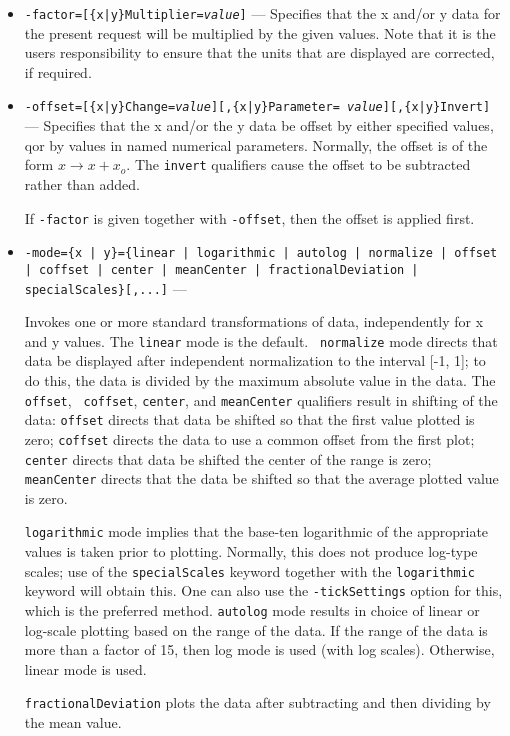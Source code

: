 \begin{itemize}
\begin{itemize}
\begin{itemize}
  \item {\tt -factor=[\{x|y\}Multiplier={\em value}]} --- Specifies that the x
and/or y data for the present request will be multiplied by the given values.  Note that it is the
users responsibility to ensure that the units that are displayed are corrected, if required.

  \item {\tt -offset=[\{x|y\}Change={\em value}][,\{x|y\}Parameter={\em
value}][,\{x|y\}Invert]} --- Specifies that the x and/or the y data be
offset by either specified values, qor by values in named numerical
parameters.  Normally, the offset is of the form $x \rightarrow
x+x_o$.  The {\tt invert} qualifiers cause the offset to be subtracted
rather than added.

If {\tt -factor} is given together with {\tt -offset}, then the offset is applied first.

  \item {\tt -mode=\{x | y\}=\{linear | logarithmic | autolog | normalize | offset | coffset | center | meanCenter | fractionalDeviation | specialScales\}[,...]} ---

Invokes one or more standard transformations of data, independently
for x and y values.  The {\tt linear} mode is the default.  {\tt
normalize} mode directs that data be displayed after independent
normalization to the interval [-1, 1]; to do this, the data is divided
by the maximum absolute value in the data.  The {\tt offset}, {\tt
coffset}, {\tt center}, and {\tt meanCenter} qualifiers result in 
shifting of the data: {\tt offset} directs that data be shifted so 
that the first value plotted is zero; {\tt coffset} directs the data 
to use a common offset from the first plot; {\tt center} directs that 
data be shifted the center of the range is zero; {\tt meanCenter} 
directs that the data be shifted so that the average plotted value 
is zero.

{\tt logarithmic} mode implies that the base-ten logarithmic of the
appropriate values is taken prior to plotting.  Normally, this does
not produce log-type scales; use of the {\tt specialScales} keyword
together with the {\tt logarithmic} keyword will obtain this. One can
also use the {\tt -tickSettings} option for this, which is the preferred
method.  {\tt autolog} mode results in choice of linear or log-scale plotting
based on the range of the data.  If the range of the data is more than a factor
of 15, then log mode is used (with log scales).  Otherwise, linear mode is used.

{\tt fractionalDeviation} plots the data after subtracting and then dividing by the mean value.


\end{itemize}
\end{itemize}
\end{itemize}
